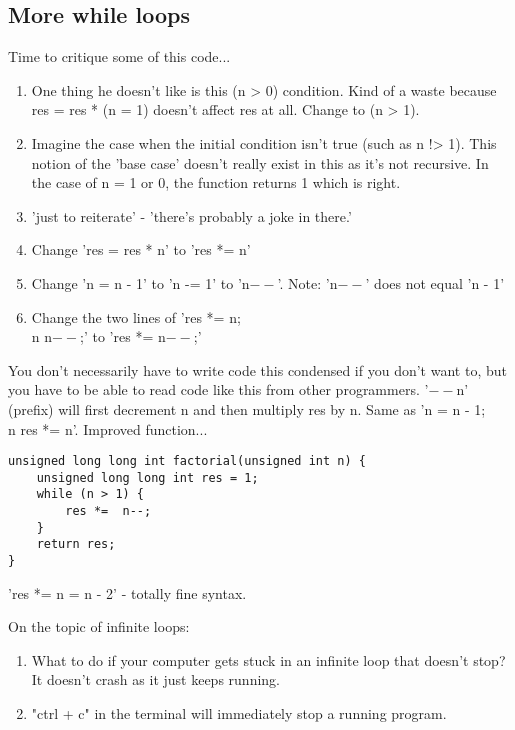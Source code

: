 \documentclass[12pt]{article}
\theoremstyle{definition}
\begin{document}
\subsection{More while loops}
Time to critique some of this code...
\begin{enumerate}
    \item One thing he doesn't like is this (n > 0) condition. Kind of a waste because res = res * (n = 1) doesn't affect res at all. Change to (n > 1). 
    \item Imagine the case when the initial condition isn't true (such as n !> 1). This notion of the 'base case' doesn't really exist in this as it's not recursive. In the case of n = 1 or 0, the function returns 1 which is right. 
    \item 'just to reiterate' - 'there's probably a joke in there.'
    \item Change 'res = res * n' to 'res *= n' 
    \item Change 'n = n - 1' to 'n -= 1' to 'n$--$'. Note: 'n$--$' does not equal 'n - 1'
    \item Change the two lines of 'res *= n; \\n n$--$;' to 'res *= n$--$;'
\end{enumerate}
\note You don't necessarily have to write code this condensed if you don't want to, but you have to be able to read code like this from other programmers. 
\note '$--$n' (prefix) will first decrement n and then multiply res by n. Same as 'n = n - 1; \\n res *= n'.
Improved function...
\begin{lstlisting}
unsigned long long int factorial(unsigned int n) {
    unsigned long long int res = 1; 
    while (n > 1) {
        res *=  n--;
    }
    return res;
}
\end{lstlisting}

\ex 'res *= n = n - 2' - totally fine syntax.

On the topic of infinite loops:
\begin{enumerate}
    \item What to do if your computer gets stuck in an infinite loop that doesn't stop? It doesn't crash as it just keeps running.
    \item "ctrl + c" in the terminal will immediately stop a running program. 
\end{enumerate}
\end{document}
